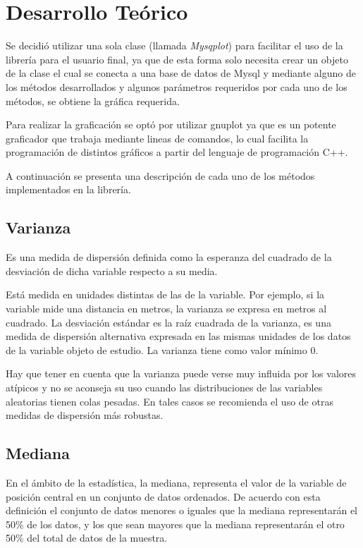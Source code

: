 \documentclass[a4paper,titlepage]{article}
\begin{document}
\section{Desarrollo Teórico} %

Se decidió utilizar una sola clase (llamada \textit{Mysqplot}) para facilitar el uso
de la librería para el usuario final, ya que de esta forma solo necesita crear un objeto
de la clase el cual se conecta a una base de datos de Mysql y mediante alguno de los
métodos desarrollados y algunos parámetros requeridos por cada uno de los métodos, 
se obtiene la gráfica requerida.

Para realizar la graficación se optó por utilizar gnuplot ya que es un potente 
graficador que trabaja mediante lineas de comandos, lo cual facilita la programación de
distintos gráficos a partir del lenguaje de programación C++.

A continuación se presenta una descripción de cada uno de los métodos implementados
en la librería.


\subsection{Varianza}
Es una medida de dispersión definida como la esperanza del cuadrado de la 
desviación de dicha variable respecto a su media.

Está medida en unidades distintas de las de la variable. Por ejemplo, si la
variable mide una distancia en metros, la varianza se expresa en metros al 
cuadrado. La desviación estándar es la raíz cuadrada de la varianza, es una 
medida de dispersión alternativa expresada en las mismas unidades de los datos
de la variable objeto de estudio. La varianza tiene como valor mínimo 0.

Hay que tener en cuenta que la varianza puede verse muy influida por los valores 
atípicos y no se aconseja su uso cuando las distribuciones de las variables 
aleatorias tienen colas pesadas. En tales casos se recomienda el uso de otras medidas 
de dispersión más robustas.

\subsection{Mediana}
En el ámbito de la estadística, la mediana, representa el valor de la variable de 
posición central en un conjunto de datos ordenados. De acuerdo con esta definición 
el conjunto de datos menores o iguales que la mediana representarán el 50\% de los 
datos, y los que sean mayores que la mediana representarán el otro 50\% del total 
de datos de la muestra.
\end{document}
